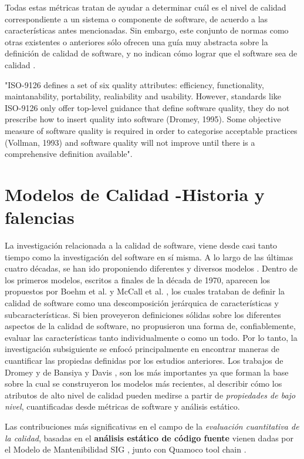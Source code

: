 Todas estas métricas tratan de ayudar a determinar cuál es el nivel de calidad correspondiente a
un sistema o componente de software, de acuerdo a las características antes mencionadas.
Sin embargo, este conjunto de normas como otras existentes o anteriores sólo ofrecen una
guía muy abstracta sobre la definición de calidad de software, y no indican cómo lograr
que el software sea de calidad \cite{Relf04}.

"ISO-9126 defines a set of six quality attributes: efficiency, functionality, maintanability,
portability, realiability and usability.
However, standards like ISO-9126 only offer top-level guidance that define software quality,
they do not prescribe how to insert quality into software (Dromey, 1995).
Some objective measure of software quality is required in order to categorise acceptable
practices (Vollman, 1993) and software quality will not improve until there is a comprehensive
definition available"\cite{Relf04}.

\section{Modelos de Calidad -Historia y falencias}

La investigación relacionada a la calidad de software, viene desde casi tanto tiempo como
la investigación del software en sí misma.
A lo largo de las últimas cuatro décadas, se han ido proponiendo diferentes y diversos 
modelos \cite{Deissenboeck2009}.
Dentro de los primeros modelos, escritos a finales de la década de 1970, aparecen los
propuestos por Boehm et al. \cite{Boehm1978} y McCall et al. \cite{McCall1977}, los cuales trataban
de definir la calidad de software como una descomposición jerárquica de características y
subcaracterísticas.
Si bien proveyeron definiciones sólidas sobre los diferentes aspectos de la calidad de software,
no propusieron una forma de, confiablemente, evaluar las características tanto individualmente
o como un todo.
Por lo tanto, la investigación subsiguiente se enfocó principalmente en encontrar maneras de
cuantificar las propiedas definidas por los estudios anteriores.
Los trabajos de Dromey \cite{Dromey1995} y de Bansiya y Davis \cite{Bansiya2002}, son los más 
importantes ya que forman la base sobre la cual se construyeron los modelos más recientes, al 
describir cómo los atributos de alto nivel de calidad pueden medirse a partir de \textit{propiedades
de bajo nivel}, cuantificadas desde métricas de software y análisis estático.

Las contribuciones más significativas en el campo de la \textit{evaluación cuantitativa de la calidad},
basadas en el \textbf{análisis estático de código fuente} vienen dadas por el Modelo de Mantenibilidad 
SIG \cite{Heitlager2007}, junto con Quamoco tool chain \cite{Wagner2012}.

